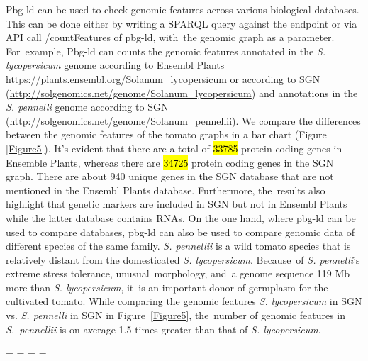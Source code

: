 \documentclass[applsci,article,accept,moreauthors,pdftex]{Definitions/mdpi}
\begin{document}
{\begin{enumerate}[label=(\Roman*),leftmargin=*,labelsep=0mm]
Pbg-ld can be used to check genomic features across various biological databases. This can be done either by writing a SPARQL query against the endpoint or via API call /countFeatures of pbg-ld, with~the genomic graph as a parameter. For~example, Pbg-ld can counts the genomic features annotated in the \textit{S. lycopersicum} genome according to Ensembl Plants \url{https://plants.ensembl.org/Solanum_lycopersicum} or according to SGN (\url{http://solgenomics.net/genome/Solanum_lycopersicum}) and annotations in the \textit{S. pennelli} genome according to SGN (\url{http://solgenomics.net/genome/Solanum_pennellii}). We compare the differences between the genomic features of the tomato graphs in a bar chart (Figure \ref{Figure5}). It’s evident that there are a total of \hl{33785}  %
protein coding genes in Ensemble Plants, whereas there are \hl{34725} protein coding genes in the SGN graph. There are about 940 unique genes in the SGN database that are not mentioned in the Ensembl Plants database. Furthermore, the~results also highlight that genetic markers are included in SGN but not in Ensembl Plants while the latter database contains RNAs.    
On the one hand, where pbg-ld can be used to compare databases, pbg-ld can also be used to compare genomic data of different species of the same family. \textit{S. pennellii} is a wild tomato species that is relatively distant from the domesticated  \textit{S. lycopersicum}. Because~of \textit{S. pennelli}’s extreme stress tolerance, unusual~morphology, and~a genome sequence 119 Mb more than \textit{S. lycopersicum}, it~is an important donor of germplasm for the cultivated tomato. While comparing the genomic features \textit{S. lycopersicum} in SGN vs. \textit{S. pennelli} in SGN in Figure~\ref{Figure5}, the~number of genomic features in \textit{S.~pennellii} is on average 1.5 times greater than that of \textit{S. lycopersicum}.  
\end{enumerate}
\newpage
\paperwidth=\pdfpageheight
\paperheight=\pdfpagewidth
\pdfpageheight=\paperheight
\pdfpagewidth=\paperwidth
{}
\fancyheadoffset[LO,RE]{0cm}
\fancyheadoffset[RO,LE]{0cm}

}
\end{document}
